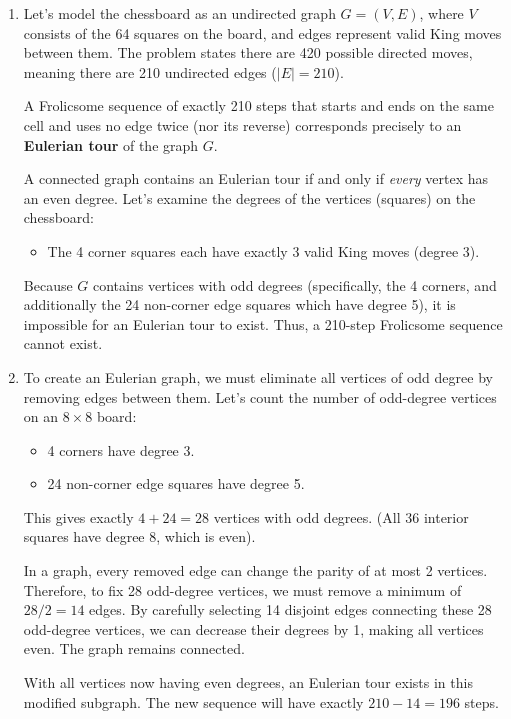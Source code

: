 \documentclass[11pt]{article}
\begin{document}
\begin{enumerate}[label=\textbf{(\alph*)}]
    \item Let's model the chessboard as an undirected graph $G = (V, E)$, where $V$ consists of the 64 squares on the board, and edges represent valid King moves between them. The problem states there are 420 possible directed moves, meaning there are 210 undirected edges ($|E| = 210$).
    
    A Frolicsome sequence of exactly 210 steps that starts and ends on the same cell and uses no edge twice (nor its reverse) corresponds precisely to an \textbf{Eulerian tour} of the graph $G$.
    
    A connected graph contains an Eulerian tour if and only if \textit{every} vertex has an even degree. Let's examine the degrees of the vertices (squares) on the chessboard:
    \begin{itemize}
        \item The 4 corner squares each have exactly 3 valid King moves (degree 3).
    \end{itemize}
    Because $G$ contains vertices with odd degrees (specifically, the 4 corners, and additionally the 24 non-corner edge squares which have degree 5), it is impossible for an Eulerian tour to exist. Thus, a 210-step Frolicsome sequence cannot exist.

    \item To create an Eulerian graph, we must eliminate all vertices of odd degree by removing edges between them.
    Let's count the number of odd-degree vertices on an $8\times8$ board:
    \begin{itemize}
        \item 4 corners have degree 3.
        \item 24 non-corner edge squares have degree 5.
    \end{itemize}
    This gives exactly $4 + 24 = 28$ vertices with odd degrees. (All 36 interior squares have degree 8, which is even).
    
    In a graph, every removed edge can change the parity of at most 2 vertices. Therefore, to fix 28 odd-degree vertices, we must remove a minimum of $28 / 2 = 14$ edges. 
    By carefully selecting 14 disjoint edges connecting these 28 odd-degree vertices, we can decrease their degrees by 1, making all vertices even. The graph remains connected. 
    
    With all vertices now having even degrees, an Eulerian tour exists in this modified subgraph. The new sequence will have exactly $210 - 14 = 196$ steps.
\end{enumerate}
\end{document}
